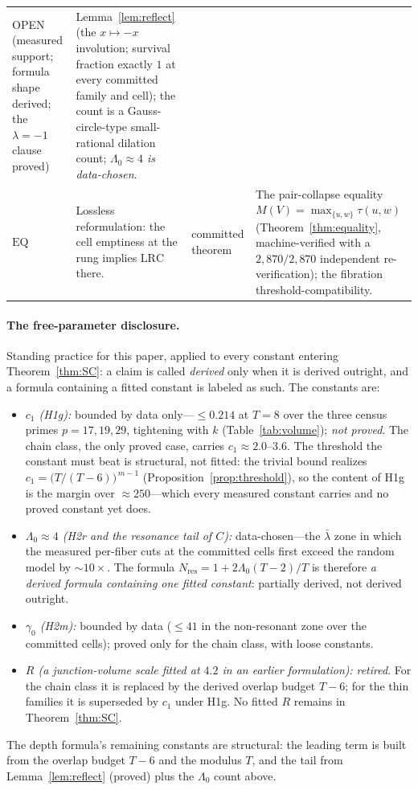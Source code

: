 {\begin{longtable}{@{}p{}p{}
                   p{}p{}@{}}
OPEN (measured support; formula shape derived; the $\lambda=-1$ clause
proved) &
Lemma~\ref{lem:reflect} (the $x\mapsto-x$ involution; survival
fraction exactly $1$ at every committed family and cell); the count is
a Gauss-circle-type small-rational dilation count;
\emph{$\Lambda_0\approx 4$ is data-chosen}. \\
$\mathrm{EQ}$ &
Lossless reformulation: the cell emptiness at the rung implies
$\mathrm{LRC}$ there. &
committed theorem &
The pair-collapse equality
$M(V)=\max_{\{u,w\}}\tau(u,w)$ (Theorem~\ref{thm:equality},
machine-verified with a $2{,}870/2{,}870$ independent re-verification);
the fibration threshold-compatibility. \\
\end{longtable}
}

\paragraph{The free-parameter disclosure.}
Standing practice for this paper, applied to every constant entering
Theorem~\ref{thm:SC}: a claim is called \emph{derived} only when it is
derived outright, and a formula containing a fitted constant is labeled
as such. The constants are:
\begin{itemize}[leftmargin=2.2em,itemsep=2pt,topsep=2pt]
\item \emph{$c_1$ (H1g):} bounded by data only---$\le 0.214$ at $T=8$
  over the three census primes $p=17,19,29$, tightening with $k$
  (Table~\ref{tab:volume}); \emph{not proved}. The chain class, the only
  proved case, carries $c_1\approx 2.0$--$3.6$. The threshold the
  constant must beat is structural, not fitted: the trivial bound
  realizes $c_1=\bigl(T/(T-6)\bigr)^{\,m-1}$
  (Proposition~\ref{prop:threshold}), so the content of H1g is the
  margin over $\approx250$---which every measured constant carries and
  no proved constant yet does.
\item \emph{$\Lambda_0\approx 4$ (H2r and the resonance tail of $C$):}
  data-chosen---the $\bar\lambda$ zone in which the measured per-fiber
  cuts at the committed cells first exceed the random model by
  $\sim 10\times$. The formula
  $N_{\mathrm{res}}=1+2\Lambda_0(T-2)/T$ is therefore \emph{a derived
  formula containing one fitted constant}: partially derived, not
  derived outright.
\item \emph{$\gamma_0$ (H2m):} bounded by data ($\le 41$ in the
  non-resonant zone over the committed cells); proved only for the chain
  class, with loose constants.
\item \emph{$R$ (a junction-volume scale fitted at $4.2$ in an earlier
  formulation):} \emph{retired}. For the chain class it is replaced by
  the derived overlap budget $T-6$; for the thin families it is
  superseded by $c_1$ under H1g. No fitted $R$ remains in
  Theorem~\ref{thm:SC}.
\end{itemize}
The depth formula's remaining constants are structural: the leading
term is built from the overlap budget $T-6$ and the modulus $T$, and
the tail from Lemma~\ref{lem:reflect} (proved) plus the $\Lambda_0$
count above.

